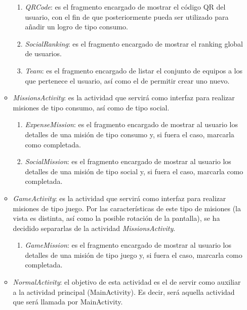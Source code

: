 \documentclass[twoside]{report}
\begin{document}
\begin{enumerate}
\begin{itemize}
\begin{enumerate}
			\item \textit{QRCode}: es el fragmento encargado de mostrar el código QR del usuario, con el fin de que posteriormente pueda ser utilizado para añadir un logro de tipo consumo.
			
			\item \textit{SocialRanking}: es el fragmento encargado de mostrar el ranking global de usuarios.
			
			\item \textit{Team}: es el fragmento encargado de listar el conjunto de equipos a los que pertenece el usuario, así como el de permitir crear uno nuevo.
		\end{enumerate}
		
	\item \textit{MissionsActivity}: es la actividad que servirá como interfaz para realizar misiones de tipo consumo, así como de tipo social. 
	
		\begin{enumerate}
		\item \textit{ExpenseMission}: es el fragmento encargado de mostrar al usuario los detalles de una misión de tipo consumo y, si fuera el caso, marcarla como completada.
		
		\item \textit{SocialMission}: es el fragmento encargado de mostrar al usuario los detalles de una misión de tipo social y, si fuera el caso, marcarla como completada.
		\end{enumerate}
		
	\item \textit{GameActivity}: es la actividad que servirá como interfaz para realizar misiones de tipo juego. Por las características de este tipo de misiones (la vista es distinta, así como la posible rotación de la pantalla), se ha decidido separarlas de la actividad \textit{MissionsActivity}.
	\begin{enumerate}
		\item \textit{GameMission}: es el fragmento encargado de mostrar al usuario los detalles de una misión de tipo juego y, si fuera el caso, marcarla como completada.
		\end{enumerate}
		
	\item \textit{NormalActivity}: el objetivo de esta actividad es el de servir como auxiliar a la actividad principal (MainActivity). Es decir, será aquella actividad que será llamada por MainActivity.
	

\end{itemize}
\end{enumerate}
\end{document}
